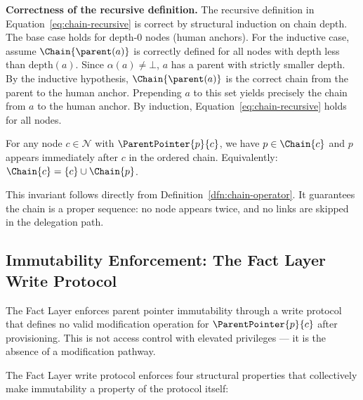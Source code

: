 \medskip
\noindent\textbf{Correctness of the recursive definition.} The recursive definition in Equation~\ref{eq:chain-recursive} is correct by structural induction on chain depth. The base case holds for depth-0 nodes (human anchors). For the inductive case, assume $\Chain{\parent(a)}$ is correctly defined for all nodes with depth less than $\text{depth}(a)$. Since $\alpha(a) \neq \bot$, $a$ has a parent with strictly smaller depth. By the inductive hypothesis, $\Chain{\parent(a)}$ is the correct chain from the parent to the human anchor. Prepending $a$ to this set yields precisely the chain from $a$ to the human anchor. By induction, Equation~\ref{eq:chain-recursive} holds for all nodes.

\begin{invariant}\label{inv:chain-integrity}
For any node $c \in \mathcal{N}$ with $\ParentPointer{p}{c}$, we have $p \in \Chain{c}$ and $p$ appears immediately after $c$ in the ordered chain. Equivalently: $\Chain{c} = \{c\} \cup \Chain{p}$.
\end{invariant}

This invariant follows directly from Definition~\ref{dfn:chain-operator}. It guarantees the chain is a proper sequence: no node appears twice, and no links are skipped in the delegation path.

\subsection{Immutability Enforcement: The Fact Layer Write Protocol}
\label{sec:fact-layer-write-protocol}

The Fact Layer enforces parent pointer immutability through a write protocol that defines no valid modification operation for $\ParentPointer{p}{c}$ after provisioning. This is not access control with elevated privileges — it is the absence of a modification pathway.

The Fact Layer write protocol enforces four structural properties that collectively make immutability a property of the protocol itself:

